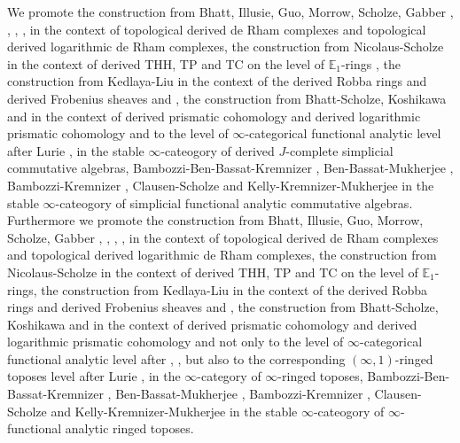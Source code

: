\documentclass[11pt]{book}
\theoremstyle{definition}
\numberwithin{equation}{section}
\begin{document}
\indent We promote the construction from Bhatt, Illusie, Guo, Morrow, Scholze, Gabber \cite{12B1}, \cite{12G1}, \cite{12Ill1}, \cite{12Ill2}, \cite{12BMS} \cite{12O} in the context of topological derived de Rham complexes and topological derived logarithmic de Rham complexes, the construction from Nicolaus-Scholze \cite{12NS} in the context of derived THH, TP and TC on the level of $\mathbb{E}_1$-rings , the construction from Kedlaya-Liu in the context of the derived Robba rings and derived Frobenius sheaves \cite{12KL1} and \cite{12KL2}, the construction from Bhatt-Scholze, Koshikawa and in the context of derived prismatic cohomology and derived logarithmic prismatic cohomology \cite{12BS} and \cite{12Ko1} to the level of $\infty$-categorical functional analytic level after Lurie \cite{12Lu1}, \cite{12Lu2} in the stable $\infty$-cateogory of derived $J$-complete simplicial commutative algebras, Bambozzi-Ben-Bassat-Kremnizer \cite{12BBBK}, Ben-Bassat-Mukherjee \cite{BBM}, Bambozzi-Kremnizer \cite{12BK}, Clausen-Scholze \cite{12CS1} \cite{12CS2} and Kelly-Kremnizer-Mukherjee \cite{KKM} in the stable $\infty$-cateogory of simplicial functional analytic commutative algebras.\\

\indent Furthermore we promote the construction from Bhatt, Illusie, Guo, Morrow, Scholze, Gabber \cite{12B1}, \cite{12G1}, \cite{12Ill1}, \cite{12Ill2}, \cite{BMS2} \cite{12O} in the context of topological derived de Rham complexes and topological derived logarithmic de Rham complexes, the construction from Nicolaus-Scholze \cite{12NS} in the context of derived THH, TP and TC on the level of $\mathbb{E}_1$-rings, the construction from Kedlaya-Liu in the context of the derived Robba rings and derived Frobenius sheaves \cite{12KL1} and \cite{12KL2}, the construction from Bhatt-Scholze, Koshikawa and in the context of derived prismatic cohomology and derived logarithmic prismatic cohomology \cite{12BS} and \cite{12Ko1} not only to the level of $\infty$-categorical functional analytic level after \cite{12Lu1}, \cite{12Lu2}, but also to the corresponding $(\infty,1)$-ringed toposes level after Lurie \cite{12Lu1}, \cite{12Lu2} in the $\infty$-category of $\infty$-ringed toposes, Bambozzi-Ben-Bassat-Kremnizer \cite{12BBBK}, Ben-Bassat-Mukherjee \cite{BBM}, Bambozzi-Kremnizer \cite{12BK}, Clausen-Scholze \cite{12CS1} \cite{12CS2} and Kelly-Kremnizer-Mukherjee \cite{KKM} in the stable $\infty$-cateogory of $\infty$-functional analytic ringed toposes.\\
\end{document}
